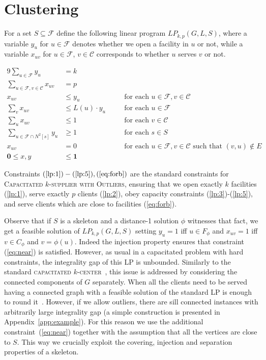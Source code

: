 \documentclass{article}
\newcommand{\F}{\mathcal{F}}
\newcommand{\C}{\mathcal{C}}
\newcommand{\fullsup}{\textsc{Capacitated} $k$-\textsc{supplier with Outliers}}
\theoremstyle{plain}
\theoremstyle{definition}
\begin{document}
\section{Clustering}
\label{sec:clustering}

For a set $S \subseteq \F$ define the following linear program
$LP_{k,p}(G,L,S)$, where a variable $y_u$ for $u \in \F$ denotes whether
we open a facility in $u$ or not, while
a variable $x_{uv}$ for $u \in \F$, $v \in \C$
corresponds to whether $u$ serves $v$ or not.

\begin{alignat}{9}
\label{lp:1} \sum_{u\in \F} y_u &= k & &\\
\label{lp:2}\sum_{u\in \F, v\in \C} x_{uv} &= p & &\\
\label{lp:3}x_{uv} &\le y_u & & \text{for each $u\in \F, v\in \C$}\\
\label{lp:4}\sum_{v} x_{uv} & \le L(u)\cdot y_u \quad & & \text{for each $u\in \F$}\\
\label{lp:5}\sum_{u} x_{uv} & \le 1 & & \text{for each $v\in \C$} \\
\label{eq:near}\sum_{u\in \F \cap N^2[s]} y_{u} &\ge 1 & & \text{for each $s\in S$}\\
\label{eq:forb}x_{uv} &= 0 & &\text{for each $u\in \F, v\in \C$ such that $(v,u)\notin E$}\\
\mathbf{0} \le x,y &\le \mathbf{1} & &
\end{alignat}


Constraints $(\ref{lp:1})-(\ref{lp:5}),(\ref{eq:forb})$
are the standard constraints for \fullsup,
ensuring that we open exactly $k$ facilities (\ref{lp:1}), 
serve exactly $p$ clients (\ref{lp:2}),
obey capacity constraints (\ref{lp:3})-(\ref{lp:5}),
and serve clients which are close to facilities (\ref{eq:forb}).

Observe that if $S$ is a skeleton and a distance-1 solution $\phi$ witnesses
that fact, we get a feasible solution of $LP_{k,p}(G,L,S)$ setting $y_u = 1$
iff $u\in F_\phi$ and $x_{uv}=1$ iff $v\in C_\phi$ and $v=\phi(u)$.
Indeed the injection property ensures that constraint (\ref{eq:near}) is satisfied.
However, as usual in a capacitated problem with hard constraints, 
the integrality gap of this LP is unbounded.
Similarly to the standard \textsc{capacitated} $k$-\textsc{center}~\cite{chk-focs12},
this issue is addressed by considering the connected components of $G$
separately. 
When all the clients need to be served having a connected graph
with a feasible solution of the standard LP is enough to round it~\cite{svensson,chk-focs12}.
However, if we allow outliers, there are sill connected instances with arbitrarily large integrality gap (a simple construction
is presented in Appendix~\ref{app:example}).
For this reason we use the additional constraint~(\ref{eq:near})
together with the assumption that all the vertices are close to $S$.
This way we crucially exploit the 
covering, injection and separation properties of a skeleton.
\end{document}
